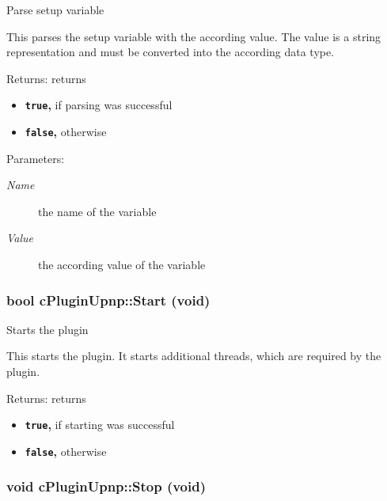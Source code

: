 Parse setup variable

This parses the setup variable with the according value. The value is a string representation and must be converted into the according data type.

\begin{Desc}
\item[Returns:]returns\begin{itemize}
\item {\bf {\tt true},} if parsing was successful\item {\bf {\tt false},} otherwise \end{itemize}
\end{Desc}
\begin{Desc}
\item[Parameters:]
\begin{description}
\item[{\em Name}]the name of the variable \item[{\em Value}]the according value of the variable \end{description}
\end{Desc}
 \hypertarget{classcPluginUpnp_4738d8a5d72e56ec8b7b2f4f0b3549fe}{
\subsubsection[{Start}]{\setlength{\rightskip}{0pt plus 5cm}bool cPluginUpnp::Start (void)}}
\label{classcPluginUpnp_4738d8a5d72e56ec8b7b2f4f0b3549fe}


Starts the plugin

This starts the plugin. It starts additional threads, which are required by the plugin.

\begin{Desc}
\item[Returns:]returns\begin{itemize}
\item {\bf {\tt true},} if starting was successful\item {\bf {\tt false},} otherwise \end{itemize}
\end{Desc}
\hypertarget{classcPluginUpnp_f59cbb0bb2a3872e33461fb46b4f79b4}{
\subsubsection[{Stop}]{\setlength{\rightskip}{0pt plus 5cm}void cPluginUpnp::Stop (void)}}
\label{classcPluginUpnp_f59cbb0bb2a3872e33461fb46b4f79b4}


